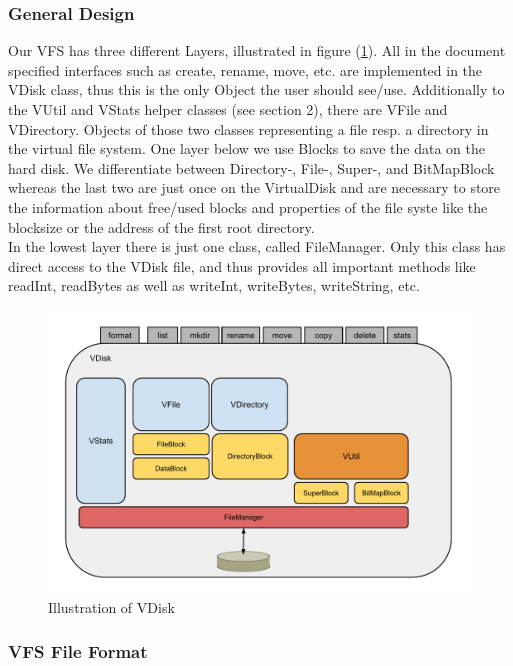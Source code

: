 \documentclass[a4paper,12pt]{article}
\begin{document}
\subsubsection{General Design}

Our VFS has three different Layers, illustrated in figure (\ref{abstactVdisk}). All in the document specified interfaces such as create, rename, move, etc. are implemented in the VDisk class, thus this is the only Object the user should see/use. Additionally to the VUtil and VStats helper classes (see section 2), there are VFile and VDirectory. Objects of those two classes representing a file resp. a directory in the virtual file system. One layer below we use Blocks to save the data on the hard disk. We differentiate between Directory-, File-, Super-, and BitMapBlock whereas the last two are just once on the VirtualDisk and are necessary to store the information about free/used blocks and properties of the file syste like the blocksize or the address of the first root directory.\\
In the lowest layer there is just one class, called FileManager. Only this class has direct access to the VDisk file, and thus provides all important methods like readInt, readBytes as well as writeInt, writeBytes, writeString, etc. 


\begin{figure}[h]
\begin{center}
\includegraphics[scale=0.4]{images/AVDisk.pdf}
\caption{Illustration of VDisk}
\label{abstactVdisk}
\end{center}
\end{figure}

\subsubsection{VFS File Format}
\end{document}
